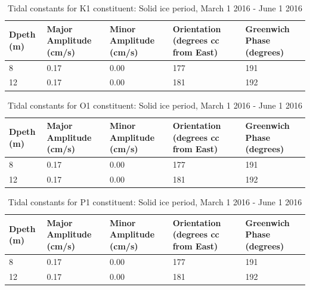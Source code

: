 \documentclass[12pt]{dforeport}
\begin{document}
\begin{table}[ht]
\centering
\caption[Tidal Constituents, K1, Solid Ice, 2015]{Tidal constants for K1 constituent: Solid ice period, March 1 2016 - June 1 2016} 
\label{t:k1_si_2015}
\begin{tabular}{p{0.3in}p{.7in}p{.7in}p{.7in}p{.7in}}
 Dpeth (m) & Major Amplitude (cm/s) & Minor Amplitude (cm/s) & Orientation (degrees cc from East) & Greenwich Phase (degrees) \\ 
  \hline
8 & 0.17 & 0.00 & 177 & 191 \\
12 & 0.17 & 0.00 & 181 & 192 \\
   \hline
\end{tabular}
\end{table}

\begin{table}[ht]
\centering
\caption[Tidal Constituents, O1, Solid Ice, 2015]{Tidal constants for O1 constituent: Solid ice period, March 1 2016 - June 1 2016} 
\label{t:o1_si_2015}
\begin{tabular}{p{0.3in}p{.7in}p{.7in}p{.7in}p{.7in}}
 Dpeth (m) & Major Amplitude (cm/s) & Minor Amplitude (cm/s) & Orientation (degrees cc from East) & Greenwich Phase (degrees) \\ 
  \hline
8 & 0.17 & 0.00 & 177 & 191 \\
12 & 0.17 & 0.00 & 181 & 192 \\
   \hline
\end{tabular}
\end{table}

\begin{table}[ht]
\centering
\caption[Tidal Constituents, P1, Solid Ice, 2015]{Tidal constants for P1 constituent: Solid ice period, March 1 2016 - June 1 2016} 
\label{t:p1_si_2015}
\begin{tabular}{p{0.3in}p{.7in}p{.7in}p{.7in}p{.7in}}
 Dpeth (m) & Major Amplitude (cm/s) & Minor Amplitude (cm/s) & Orientation (degrees cc from East) & Greenwich Phase (degrees) \\ 
  \hline
8 & 0.17 & 0.00 & 177 & 191 \\
12 & 0.17 & 0.00 & 181 & 192 \\
   \hline
\end{tabular}
\end{table}
\end{document}
